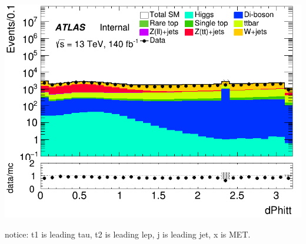 \documentclass[usenames,dvipsnames]{beamer}
\begin{document}
\begin{frame}
\begin{minipage}{0.32\textwidth}
        \includegraphics[width=\textwidth]{graphics/LH_met/LH_met_dPhitt.png}
    \end{minipage}
    notice: t1 is leading tau, t2 is leading lep, j is leading jet, x is MET.
\end{frame}
\end{document}
